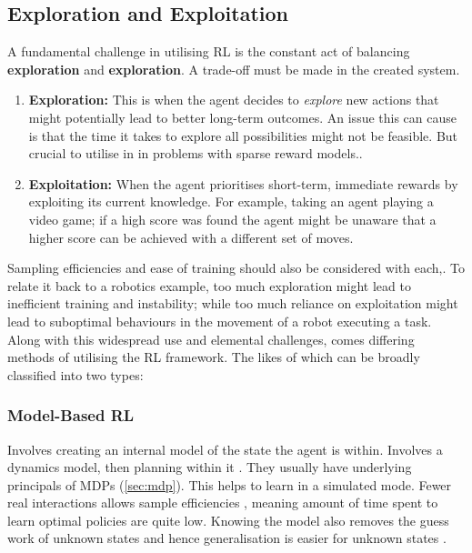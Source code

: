   \subsection{Exploration and Exploitation}
  
  A fundamental challenge in utilising RL is the constant act of balancing \textbf{exploration} and \textbf{exploration}. A trade-off must be made in the created system.
  \begin{enumerate}
    \item \textbf{Exploration:}
    This is when the agent decides to \emph{explore} new actions that might potentially lead to better long-term outcomes. An issue this can cause is that the time it takes to explore all possibilities might not be feasible. But crucial to utilise in in problems with sparse reward models..
    \item \textbf{Exploitation:}
    When the agent prioritises short-term, immediate rewards by exploiting its current knowledge. For example, taking an agent playing a video game; if a high score was found the agent might be unaware that a higher score can be achieved with a different set of moves. 
  \end{enumerate}
  
  Sampling efficiencies and ease of training \cite{liu2019simpleexplorationsampleefficient} should also be considered with each,. To relate it back to a robotics example, too much exploration might lead to  inefficient training and instability; while too much reliance on exploitation might lead to suboptimal behaviours in the movement of a robot executing a task. Along with this widespread use and elemental challenges, comes differing methods of utilising the RL framework. The likes of which can be broadly classified into two types: 

  \subsubsection{Model-Based RL}
  Involves creating an internal model of the state the agent is within. Involves a dynamics model, then planning within it \cite{MAL-086}. They usually have underlying principals of MDPs (\ref{sec:mdp}). This helps to learn in a simulated mode. Fewer real interactions allows sample efficiencies \cite{liu2021DRLminireview,wu23robotLearn}, meaning amount of time spent to learn optimal policies are quite low. Knowing the model also removes the guess work of unknown states and hence generalisation is easier for unknown states \cite{MAL-086}.

